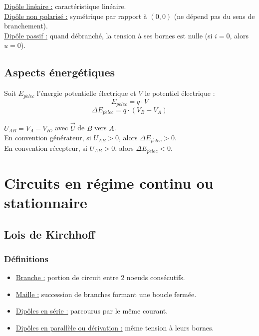 \documentclass[13pt, twoside, a4paper, french]{report}
\begin{document}
            \underline{Dipôle linéaire :} caractéristique linéaire.\\
            \underline{Dipôle non polarisé :} symétrique par rapport à $(0, 0)$ (ne dépend pas du sens de branchement).\\
            \underline{Dipôle passif :} quand débranché, la tension à ses bornes est nulle (si $i = 0$, alors $u = 0$).\\
        
        
        \section{Aspects énergétiques}\label{sec:aspects-energetiques}
            
            Soit $E_{p\acute elec}$ l'énergie potentielle électrique et $V$ le potentiel électrique :
            \begin{equation}
                E_{p\acute elec} = q \cdot V\label{eq:equation1}
            \end{equation}
            \begin{equation}
                \Delta E_{p\acute elec} = q \cdot (V_B - V_A) \label{eq:equation2}
            \end{equation}
            
            $U_{AB} = V_A - V_B$, avec $\vec U$ de $B$ vers $A$.\\
            En convention générateur, si $U_{AB} > 0$, alors $\Delta E_{p\acute elec} > 0$.\\
            En convention récepteur, si $U_{AB} > 0$, alors $\Delta E_{p\acute elec} < 0$.
    
    
    \chapter{Circuits en régime continu ou stationnaire}\label{ch:circuits-en-regime-continu-ou-stationnaire}
        
        
        \section{Lois de Kirchhoff}\label{sec:lois-de-kirchhoff}
            
            \subsection{Définitions}\label{subsec:definitions}
                \begin{itemize}
                    \item \underline{Branche :} portion de circuit entre 2 noeuds consécutifs.
                    \item \underline{Maille :} succession de branches formant une boucle fermée.
                    \item \underline{Dipôles en série :} parcourus par le même courant.
                    \item \underline{Dipôles en parallèle ou dérivation :} même tension à leurs bornes.
                \end{itemize}
            
\end{document}
